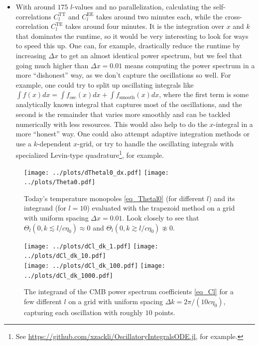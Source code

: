 \documentclass[10pt,a4paper]{article}
\begin{document}
\begin{itemize}
\item
With around $175$ $l$-values and no parallelization,
calculating the self-correlations $C_l^\text{TT}$ and $C_l^\text{EE}$ takes around two minutes each,
while the cross-correlation $C_l^\text{TE}$ takes around four minutes.
It is the integration over $x$ and $k$ that dominates the runtime,
so it would be very interesting to look for ways to speed this up.
One can, for example, drastically reduce the runtime by increasing $\Delta x$ to get an almost identical power spectrum,
but we feel that going much higher than $\Delta x = 0.01$ means computing the power spectrum in a more ``dishonest'' way,
as we don't capture the oscillations so well.
For example, one could try to split up oscillating integrals like
$\int f(x) dx = \int f_\text{osc}(x) dx + \int f_\text{smooth}(x) dx$,
where the first term is some analytically known integral that captures most of the oscillations,
and the second is the remainder that varies more smoothly and can be tackled numerically with less resources.
This would also help to do the $x$-integral in a more ``honest'' way.
One could also attempt adaptive integration methods or use a $k$-dependent $x$-grid,
or try to handle the oscillating integrals with specialized Levin-type quadrature\footnote{See \href{https://github.com/xzackli/OscillatoryIntegralsODE.jl}{https://github.com/xzackli/OscillatoryIntegralsODE.jl}, for example.}, for example.
\end{itemize}

\begin{figure}[ph]
\centering
\texttt{[image: ../plots/dThetal0\_dx.pdf]} \hfill
\texttt{[image: ../plots/Theta0.pdf]}
\caption{
	Today's temperature monopoles \eqref{eq_Thetal0} (for different $l$) and its integrand (for $l=10$) evaluated with the trapezoid method on a grid with uniform spacing $\Delta x = 0.01$.
	Look closely to see that
	$\Theta_l(0,k\lesssim l / c \eta_0) \approx 0$ and
	$\Theta_l(0,k\gtrsim l / c \eta_0) \not\approx 0$.
}
\label{fig_Theta0}

\bigskip \bigskip \bigskip

\texttt{[image: ../plots/dCl\_dk\_1.pdf]} \hfill
\texttt{[image: ../plots/dCl\_dk\_10.pdf]} \\
\texttt{[image: ../plots/dCl\_dk\_100.pdf]} \hfill
\texttt{[image: ../plots/dCl\_dk\_1000.pdf]}
\caption{The integrand of the CMB power spectrum coefficients \eqref{eq_Cl} for a few different $l$ on a grid with uniform spacing $\Delta k = 2\pi/(10c\eta_0)$, capturing each oscillation with roughly $10$ points.}
\label{fig_dCl_dk}
\end{figure}
\end{document}
